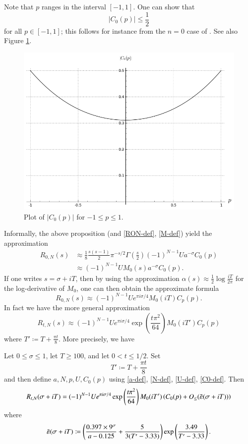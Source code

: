 Note that $p$ ranges in the interval $[-1,1]$.  One can show that 
\begin{equation}\label{cop}
|C_0(p)| \leq \frac{1}{2}
\end{equation}
for all $p \in [-1,1]$; this follows for instance from the $n=0$ case of \cite[Theorem 6.1]{arias}.  See also Figure \ref{c0p}.

\begin{figure}[h!]
  \includegraphics[width=0.7\linewidth]{C0_p.png}
  \caption{Plot of $|C_0(p)|$ for $-1 \leq p \leq 1$.}
	\label{c0p}
\end{figure}

Informally, the above proposition (and \eqref{RON-def}, \eqref{M-def}) yield the approximation
\begin{align*}
 R_{0,N}(s) &\approx \frac{1}{8} \frac{s(s-1)}{2} \pi^{-s/2} \Gamma\left(\frac{s}{2}\right) (-1)^{N-1} U a^{-\sigma} C_0(p) \\
&\approx (-1)^{N-1} U M_0(s) a^{-\sigma} C_0(p).
\end{align*}
If one writes $s = \sigma+iT$, then by using the approximation $\alpha(s) \approx \frac{1}{2} \log \frac{iT}{2\pi}$ for the log-derivative of $M_0$, one can then obtain the approximate formula
$$ R_{0,N}(s) \approx (-1)^{N-1} U e^{\pi i \sigma/4} M_0(iT) C_p(p).$$
In fact we have the more general approximation
$$ R_{t,N}(s) \approx (-1)^{N-1} U e^{\pi i \sigma/4} \exp\left( \frac{t \pi^2}{64}\right) M_0(iT') C_p(p)$$
where $T' \coloneqq T + \frac{\pi t}{8}$.  More precisely, we have

\begin{proposition}\label{RTN-prop}  Let $0 \leq \sigma \leq 1$, let $T \geq 100$, and let $0 < t \leq 1/2$.  Set
$$ T' \coloneqq T + \frac{\pi t}{8} $$
and then define $a,N,p,U,C_0(p)$ using \eqref{a-def}, \eqref{N-def}, \eqref{U-def}, \eqref{C0-def}.
Then 
$$
 R_{t,N}(\sigma+iT) = (-1)^{N-1} U e^{\pi i \sigma/4} \exp\left( \frac{t \pi^2}{64}\right) M_0(iT') \left( C_0(p) + O_{\leq}( \tilde {\varepsilon}(\sigma+iT))\right)$$
where
\begin{equation}\label{epsp-def}
 \tilde {\varepsilon}(\sigma+iT) \coloneqq \left(\frac{0.397 \times 9^\sigma}{a-0.125} + \frac{5}{3(T'-3.33)}\right) \exp\left( \frac{3.49}{T'-3.33} \right).
\end{equation}
\end{proposition}


